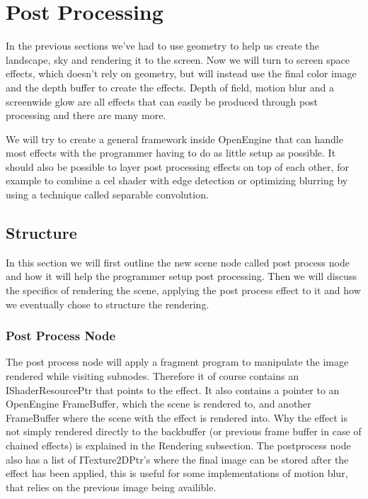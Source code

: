 \chapter{Post Processing}


In the previous sections we've had to use geometry to help us create
the landscape, sky and rendering it to the screen. Now we will turn to
screen space effects, which doesn't rely on geometry, but will instead
use the final color image and the depth buffer to create the
effects. Depth of field, motion blur and a screenwide glow are all
effects that can easily be produced through post processing and there
are many more.


We will try to create a general framework inside OpenEngine that can
handle most effects with the programmer having to do as little setup
as possible. It should also be possible to layer post processing
effects on top of each other, for example to combine a cel shader with
edge detection or optimizing blurring by using a technique called
separable convolution.

\section{Structure}

In this section we will first outline the new scene node called post
process node and how it will help the programmer setup post
processing. Then we will discuss the specifics of rendering the scene,
applying the post process effect to it and how we eventually chose to
structure the rendering.

\subsection*{Post Process Node}

The post process node will apply a fragment program to manipulate the
image rendered while visiting subnodes. Therefore it of course
contains an IShaderResourcePtr that points to the effect. It also
contains a pointer to an OpenEngine FrameBuffer, which the scene is
rendered to, and another FrameBuffer where the scene with the effect
is rendered into. Why the effect is not simply rendered directly to
the backbuffer (or previous frame buffer in case of chained effects)
is explained in the Rendering subsection. The postprocess node also
has a list of ITexture2DPtr's where the final image can be stored
after the effect has been applied, this is useful for some
implementations of motion blur, that relies on the previous image
being availible.

